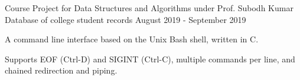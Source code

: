 
\begin{cventries}
    \cventry
        {Course Project for Data Structures and Algorithms under Prof. Subodh Kumar} %
        {Database of college student records} %
        {} %
        {August 2019 - September 2019} %
        {
        \begin{cvitems} %
            \item {A command line interface based on the Unix Bash shell, written in C.}
		    \item {Supports EOF (Ctrl-D) and SIGINT (Ctrl-C), multiple commands per line, and chained redirection and piping.}
        \end{cvitems}
        }

\end{cventries}